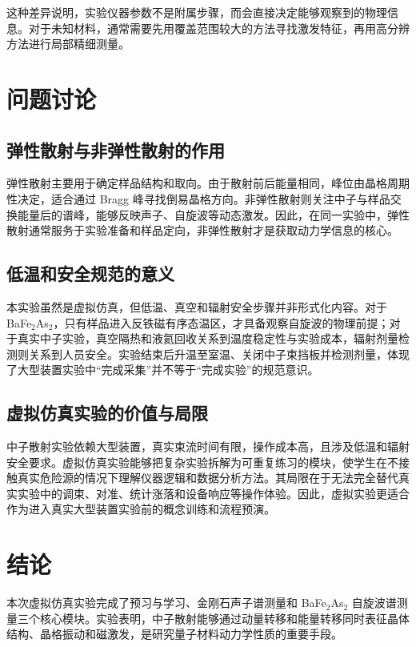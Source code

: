 \documentclass[a4paper]{ctexart}
\begin{document}
这种差异说明，实验仪器参数不是附属步骤，而会直接决定能够观察到的物理信息。对于未知材料，通常需要先用覆盖范围较大的方法寻找激发特征，再用高分辨方法进行局部精细测量。

\section{问题讨论}

\subsection{弹性散射与非弹性散射的作用}

弹性散射主要用于确定样品结构和取向。由于散射前后能量相同，峰位由晶格周期性决定，适合通过 Bragg 峰寻找倒易晶格方向。非弹性散射则关注中子与样品交换能量后的谱峰，能够反映声子、自旋波等动态激发。因此，在同一实验中，弹性散射通常服务于实验准备和样品定向，非弹性散射才是获取动力学信息的核心。

\subsection{低温和安全规范的意义}

本实验虽然是虚拟仿真，但低温、真空和辐射安全步骤并非形式化内容。对于 BaFe$_2$As$_2$，只有样品进入反铁磁有序态温区，才具备观察自旋波的物理前提；对于真实中子实验，真空隔热和液氦回收关系到温度稳定性与实验成本，辐射剂量检测则关系到人员安全。实验结束后升温至室温、关闭中子束挡板并检测剂量，体现了大型装置实验中“完成采集”并不等于“完成实验”的规范意识。

\subsection{虚拟仿真实验的价值与局限}

中子散射实验依赖大型装置，真实束流时间有限，操作成本高，且涉及低温和辐射安全要求。虚拟仿真实验能够把复杂实验拆解为可重复练习的模块，使学生在不接触真实危险源的情况下理解仪器逻辑和数据分析方法。其局限在于无法完全替代真实实验中的调束、对准、统计涨落和设备响应等操作体验。因此，虚拟实验更适合作为进入真实大型装置实验前的概念训练和流程预演。

\section{结论}

本次虚拟仿真实验完成了预习与学习、金刚石声子谱测量和 BaFe$_2$As$_2$ 自旋波谱测量三个核心模块。实验表明，中子散射能够通过动量转移和能量转移同时表征晶体结构、晶格振动和磁激发，是研究量子材料动力学性质的重要手段。
\end{document}
